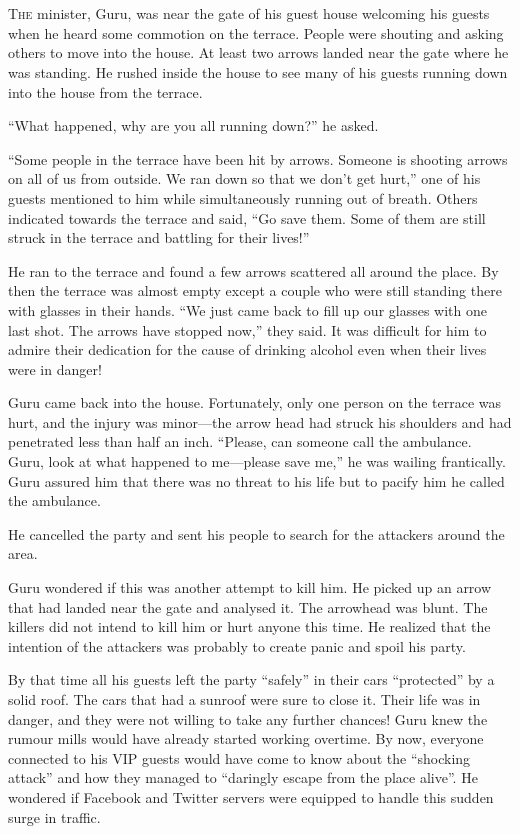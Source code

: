 \chapter{}

\lettrine{T}{he} minister, Guru, was near the gate of his guest house welcoming his guests
when he heard some commotion on the terrace. People were shouting and asking
others to move into the house. At least two arrows landed near the gate where he
was standing. He rushed inside the house to see many of his guests running down
into the house from the terrace.

“What happened, why are you all running down?” he asked.

“Some people in the terrace have been hit by arrows. Someone is shooting arrows
on all of us from outside. We ran down so that we don't get hurt,” one of his
guests mentioned to him while simultaneously running out of breath. Others
indicated towards the terrace and said, “Go save them. Some of them are still
struck in the terrace and battling for their lives!”

He ran to the terrace and found a few arrows scattered all around the place. By
then the terrace was almost empty except a couple who were still standing there
with glasses in their hands. “We just came back to fill up our glasses with one
last shot. The arrows have stopped now,” they said. It was difficult for him to
admire their dedication for the cause of drinking alcohol even when their lives
were in danger!

Guru came back into the house. Fortunately, only one person on the terrace was
hurt, and the injury was minor—the arrow head had struck his shoulders and
had penetrated less than half an inch. “Please, can someone call the
ambulance. Guru, look at what happened to me—please save me,” he was wailing
frantically. Guru assured him that there was no threat to his life but to pacify
him he called the ambulance.

He cancelled the party and sent his people to search for the attackers around the
area.

Guru wondered if this was another attempt to kill him. He picked up an arrow
that had landed near the gate and analysed it. The arrowhead was blunt. The
killers did not intend to kill him or hurt anyone this time. He realized that
the intention of the attackers was probably to create panic and spoil his party.

By that time all his guests left the party “safely” in their cars “protected” by
a solid roof. The cars that had a sunroof were sure to close it. Their life was
in danger, and they were not willing to take any further chances! Guru knew the
rumour mills would have already started working overtime. By now, everyone
connected to his VIP guests would have come to know about the “shocking attack”
and how they managed to “daringly escape from the place alive”. He wondered if
Facebook and Twitter servers were equipped to handle this sudden surge in
traffic.

